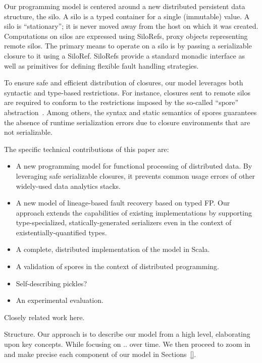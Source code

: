 \documentclass{sigplanconf}
\theoremstyle{definition}
\theoremstyle{definition}
\begin{document}
Our programming model is centered around a new distributed persistent data
structure, the silo. A silo is a typed container for a single (immutable)
value. A silo is ``stationary''; it is never moved away from the host on which
it was created. Computations on silos are expressed using SiloRefs, proxy
objects representing remote silos. The primary means to operate on a silo is
by passing a serializable closure to it using a SiloRef. SiloRefs provide a
standard monadic interface as well as primitives for defining flexible fault
handling strategies.

To ensure safe and efficient distribution of closures, our model leverages
both syntactic and type-based restrictions. For instance, closures sent to
remote silos are required to conform to the restrictions imposed by the so-called
``spore'' abstraction~\cite{Spores}. Among others, the syntax and
static semantics of spores guarantees the absence of runtime serialization
errors due to closure environments that are not serializable.

The specific technical contributions of this paper are:

\begin{itemize}
\item A new programming model for functional processing of distributed data. By
leveraging safe serializable closures, it prevents common usage errors of
other widely-used data analytics stacks.

\item A new model of lineage-based fault recovery based on typed FP. Our approach
extends the capabilities of existing implementations by supporting type-specialized,
statically-generated serializers even in the context of
existentially-quantified types.

\item A complete, distributed implementation of the model in Scala.

\item A validation of spores in the context of distributed programming.

\item Self-describing pickles?

\item An experimental evaluation.
\end{itemize}

Closely related work here.

Structure. Our approach is to describe our model from a high level,
elaborating upon key concepts. While focusing on .. over time. We then proceed
to zoom in and make precise each component of our model in Sections~\ref{}.
\end{document}
